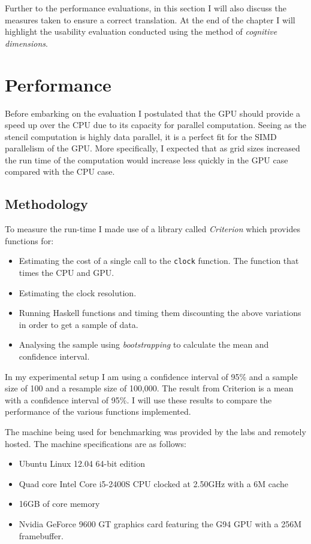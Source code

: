 \documentclass[12pt,a4paper,oneside]{scrbook}
\begin{document}
Further to the performance evaluations, in this section I will also discuss the
measures taken to ensure a correct translation. At the end of the chapter I will
highlight the usability evaluation conducted using the method of \emph{cognitive
  dimensions}.

\section{Performance}

Before embarking on the evaluation I postulated that the GPU should
provide a speed up over the CPU due to its capacity for parallel
computation. Seeing as the stencil computation is highly data parallel,
it is a perfect fit for the SIMD parallelism of the GPU. More
specifically, I expected that as grid sizes increased the run time of
the computation would increase less quickly in the GPU case compared
with the CPU case.

\subsection{Methodology}

To measure the run-time I made use of a library called \emph{Criterion}
which provides functions for:

\begin{itemize}
\itemsep1pt\parskip0pt
\item
  Estimating the cost of a single call to the \texttt{clock} function.
  The function that times the CPU and GPU.
\item
  Estimating the clock resolution.
\item
  Running Haskell functions and timing them discounting the above
  variations in order to get a sample of data.
\item
  Analysing the sample using \emph{bootstrapping}\cite{} to calculate the
  mean and confidence interval.
\end{itemize}

In my experimental setup I am using a confidence interval of 95\% and a
sample size of 100 and a resample size of 100,000. The result from
Criterion is a mean with a confidence interval of 95\%. I will use these
results to compare the performance of the various functions implemented.

The machine being used for benchmarking was provided by the labs and
remotely hosted. The machine specifications are as follows:

\begin{itemize}
\itemsep1pt\parskip0pt
\item
  Ubuntu Linux 12.04 64-bit edition
\item
  Quad core Intel Core i5-2400S CPU clocked at 2.50GHz with a 6M cache
\item
  16GB of core memory
\item
  Nvidia GeForce 9600 GT graphics card featuring the G94 GPU with a 256M
  framebuffer.
\end{itemize}
\end{document}
